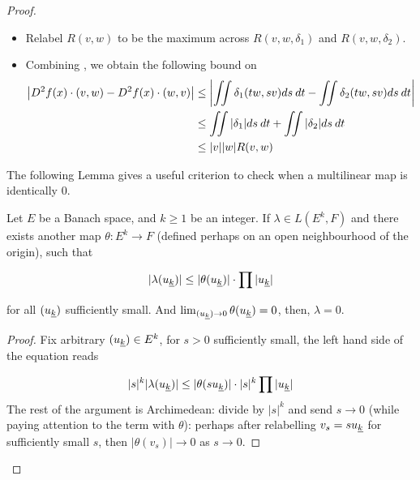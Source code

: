 \documentclass[../main-manifolds.tex]{subfiles}
\begin{document}
\begin{proof}
\begin{note}
\begin{itemize}
        $A$ is clearly compact, and the continuity of $D^2f$ means 
        
        \begin{equation}\label{second-derivative-R}
        R(v,w,\delta) = \sup_{y\in A}\abs{D^2f(x + y) - D^2f(x)}\quad\text{is finite},\qqtext{and}\lim_{(v,w)\to 0}R(v,w,\delta)=0
        \end{equation}
        
        See the remark after this proof for a generalized version of this 'compact linear combination' argument.
        
        \item Relabel $R(v,w)$ to be the maximum across $R(v,w,\delta_1)$ and $R(v,w,\delta_2)$. 
        \item Combining , we obtain the following bound on 
        \begin{align}
            \abs{D^2f(x)\cdot(v,w) - D^2f(x)\cdot(w,v)} &\leq \abs{\iint\delta_1(tw,sv) ds\: dt - \iint\delta_2(tw,sv)ds\: dt}\nonumber\\
            &\leq \iint\abs{\delta_1}ds\: dt + \iint\abs{\delta_2}ds\: dt\nonumber \\
            &\leq \abs{v}\abs{w}R(v,w)\label{second-derivative-step3}
        \end{align}
    \end{itemize}

    The following Lemma gives a useful criterion to check when a multilinear map is identically $0$.
    \begin{lemma}
        Let $E$ be a Banach space, and $k\geq 1$ be an integer. If $\lambda\in L(E^k, F)$ and there exists another map $\theta: E^k\to F$ (defined perhaps on an open neighbourhood of the origin), such that

        \[
        \vert \lambda(\UL{u}[k])\vert \leq\vert\theta(\UL{u}[k])\vert\cdot\prod\vert \UL{u}[k]\vert
        \]
        
        for all $(\UL{u}[k])$ sufficiently small. And $\lim_{(\UL{u}[k]) \to 0}\theta(\UL{u}[k])=0$, then, $\lambda=0$.
    \end{lemma}
    \begin{proof}
        Fix arbitrary $(\UL{u}[k])\in E^k$, for $s>0$ sufficiently small, the left hand side of the equation reads

        \[
            \vert s\vert^k\vert\lambda (\UL{u}[k])\vert\leq\vert\theta(s\UL{u}[k])\vert\cdot\vert s\vert^k\prod \vert\UL{u}[k]\vert
        \]
        The rest of the argument is Archimedean: divide by $\vert s\vert^k$ and send $s\to 0$ (while paying attention to the term with $\theta$): perhaps after relabelling $v_s = s\UL{u}[k]$ for sufficiently small $s$, then $\vert \theta(v_s)\vert\to 0$ as $s\to 0$.
    \end{proof}
        
    \end{note}
    
    

\end{proof}
\end{document}
